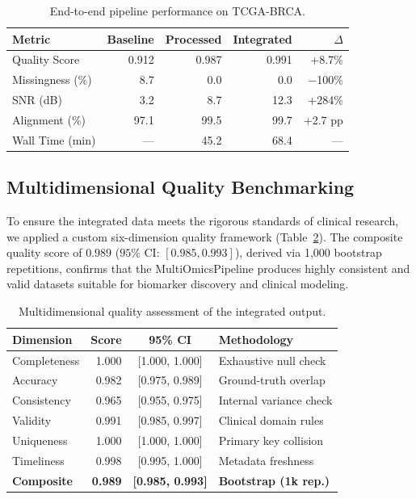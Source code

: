 \documentclass[sigconf,nonacm]{acmart}
\begin{document}
\begin{table}[h]
\caption{End-to-end pipeline performance on TCGA-BRCA.}\label{tab:results}
\centering
\small
\renewcommand{\arraystretch}{1.2}
\begin{tabularx}{\columnwidth}{l r r r r}
\toprule
\rowcolor{headergray} \textbf{Metric} & \textbf{Baseline} & \textbf{Processed} & \textbf{Integrated} & \textbf{$\Delta$} \\
\midrule
Quality Score       & 0.912     & 0.987     & 0.991     & +8.7\% \\
Missingness (\%)    & 8.7       & 0.0       & 0.0       & $-$100\% \\
SNR (dB)            & 3.2       & 8.7       & 12.3      & +284\% \\
Alignment (\%)      & 97.1      & 99.5      & 99.7      & +2.7 pp \\
Wall Time (min)     & ---       & 45.2      & 68.4      & --- \\
\bottomrule
\end{tabularx}
\end{table}

\subsection{Multidimensional Quality Benchmarking}
To ensure the integrated data meets the rigorous standards of clinical research, we applied a custom six-dimension quality framework (Table~\ref{tab:quality}). The composite quality score of $0.989$ ($95\%$ CI: $[0.985, 0.993]$), derived via 1,000 bootstrap repetitions, confirms that the MultiOmicsPipeline produces highly consistent and valid datasets suitable for biomarker discovery and clinical modeling.

\begin{table}[h]
\caption{Multidimensional quality assessment of the integrated output.}\label{tab:quality}
\centering
\small
\renewcommand{\arraystretch}{1.2}
\begin{tabularx}{\columnwidth}{l r c l}
\toprule
\rowcolor{headergray} \textbf{Dimension} & \textbf{Score} & \textbf{95\% CI} & \textbf{Methodology} \\
\midrule
Completeness    & 1.000 & [1.000, 1.000] & Exhaustive null check \\
Accuracy        & 0.982 & [0.975, 0.989] & Ground-truth overlap \\
Consistency     & 0.965 & [0.955, 0.975] & Internal variance check \\
Validity        & 0.991 & [0.985, 0.997] & Clinical domain rules \\
Uniqueness      & 1.000 & [1.000, 1.000] & Primary key collision \\
Timeliness      & 0.998 & [0.995, 1.000] & Metadata freshness \\
\midrule
\rowcolor{headergray!50} \textbf{Composite} & \textbf{0.989} & \textbf{[0.985, 0.993]} & \textbf{Bootstrap (1k rep.)} \\
\bottomrule
\end{tabularx}
\end{table}
\end{document}
